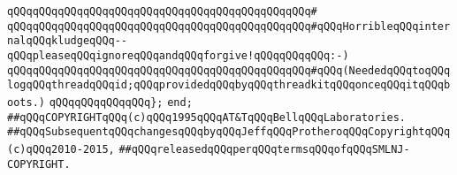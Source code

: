 \verb|qQQqqQQqqQQqqQQqqQQqqQQqqQQqqQQqqQQqqQQqqQQqqQQq#|\newline
\verb|qQQqqQQqqQQqqQQqqQQqqQQqqQQqqQQqqQQqqQQqqQQqqQQq#qQQqHorribleqQQqinternalqQQqkludgeqQQq--qQQqpleaseqQQqignoreqQQqandqQQqforgive!qQQqqQQqqQQq:-)|\newline
\verb|qQQqqQQqqQQqqQQqqQQqqQQqqQQqqQQqqQQqqQQqqQQqqQQq#qQQq(NeededqQQqtoqQQqlogqQQqthreadqQQqid;qQQqprovidedqQQqbyqQQqthreadkitqQQqonceqQQqitqQQqboots.)|\newline
\verb|qQQqqQQqqQQqqQQq};|\newline
\newline
\verb|end;|\newline
\newline
\newline
\verb|##qQQqCOPYRIGHTqQQq(c)qQQq1995qQQqAT&TqQQqBellqQQqLaboratories.|\newline
\verb|##qQQqSubsequentqQQqchangesqQQqbyqQQqJeffqQQqProtheroqQQqCopyrightqQQq(c)qQQq2010-2015,|\newline
\verb|##qQQqreleasedqQQqperqQQqtermsqQQqofqQQqSMLNJ-COPYRIGHT.|\newline

